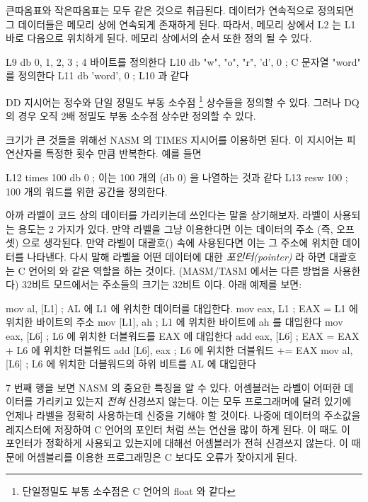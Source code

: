 큰따옴표와 작은따옴표는 모두 같은 것으로 취급된다. 데이터가 연속적으로 정의되면 그 데이터들은 메모리 상에 연속되게 존재하게 된다. 
따라서, 메모리 상에서 L2 는 L1 바로 다음으로 위치하게 된다. 메모리 상에서의 순서 또한 정의 될 수 있다. 

\begin{AsmCodeListing}[frame=none, numbers=none]
L9    db     0, 1, 2, 3              ; 4 바이트를 정의한다
L10   db     "w", "o", "r", 'd', 0   ; C 문자열 "word" 를 정의한다
L11   db     'word', 0               ; L10 과 같다
\end{AsmCodeListing}

{\code DD}  지시어는 정수와 단일 정밀도 부동 소수점 \footnote{단일정밀도 부동 소수점은 C 언어의 {\code float} 와 같다} 상수들을 
정의할 수 있다. 그러나 {\code DQ} 의 경우 오직 2배 정밀도 부동 소수점 상수만 정의할 수 있다.

크기가 큰 것들을 위해선 NASM 의 {\code TIMES}  지시어를 이용하면 된다. 이 지시어는 피연산자를 특정한 횟수 만큼 반복한다. 
예를 들면

\begin{AsmCodeListing}[frame=none, numbers=none]
L12   times 100 db 0                 ; 이는 100 개의 (db 0) 을 나열하는 것과 같다
L13   resw   100                     ; 100 개의 워드를 위한 공간을 정의한다.
\end{AsmCodeListing}

아까 라벨이 코드 상의 데이터를 가리키는데 쓰인다는 말을 상기해보자. 라벨이 사용되는 용도는 2 가지가 있다. 만약 라벨을 그냥 이용한다면
이는 데이터의 주소 (즉, 오프셋) 으로 생각된다. 만약 라벨이 대괄호({\code []}) 속에 사용된다면 이는 그 주소에 위치한 데이터를 나타낸다. 
다시 말해 라벨을 어떤 데이터에 대한 \emph{포인터(pointer)} 라 하면 대괄호는 C 언어의 \* 와 같은 역할을 하는 것이다. 
(MASM/TASM 에서는 다른 방법을 사용한다) 32비트 모드에서는 주소들의 크기는 32비트 이다. 아래 예제를 보면: 

\begin{AsmCodeListing}[frame=none]
      mov    al, [L1]      ; AL 에 L1 에 위치한 데이터를 대입한다.
      mov    eax, L1       ; EAX = L1 에 위치한 바이트의 주소 
      mov    [L1], ah      ; L1 에 위치한 바이트에 ah 를 대입한다
      mov    eax, [L6]     ; L6 에 위치한 더블워드를 EAX 에 대입한다
      add    eax, [L6]     ; EAX = EAX + L6 에 위치한 더블워드
      add    [L6], eax     ; L6 에 위치한 더블워드 += EAX
      mov    al, [L6]      ; L6 에 위치한 더블워드의 하위 비트를 AL 에 대입한다 
\end{AsmCodeListing}
7 번째 행을 보면 NASM 의 중요한 특징을 알 수 있다. 어셈블러는 라벨이 어떠한 데이터를 가리키고 있는지 \emph{전혀} 신경쓰지 않는다. 이는 모두
프로그래머에 달려 있기에 언제나 라벨을 정확히 사용하는데 신중을 기해야 할 것이다. 나중에 데이터의 주소값을 레지스터에 저장하여 C 언어의
포인터 처럼 쓰는 연산을 많이 하게 된다. 이 때도 이 포인터가 정확하게 사용되고 있는지에 대해선 어셈블러가 전혀 신경쓰지 않는다. 이 때문에
어셈블리를 이용한 프로그래밍은 C 보다도 오류가 잦아지게 된다. 

